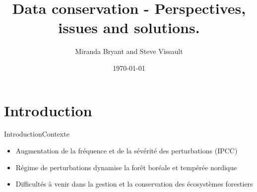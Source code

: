 \documentclass{eecslides}
\title[Data Storage]{Data conservation - Perspectives, issues and solutions.}
\author[M. Bryant and S. Vissault]{\color{white}  Miranda Bryant and Steve Vissault}
\institute[\color{white} UQAR]{\color{white} \textbf{Les midis numériques}}
\date{ \color{white} \today}
\begin{document}
\begin{frame}[plain]
\titlepage
\end{frame}


\section{Introduction}

\begin{frame}{Introduction}{Contexte}

\begin{itemize} 
	\item Augmentation de la fréquence et de la sévérité des perturbations (IPCC)
	\item Régime de perturbations dynamise la forêt boréale et tempérée nordique
	\item Difficultés à venir dans la gestion et la conservation des écosystèmes forestiers
\end{itemize}

\end{frame}





%	
%		
\end{document}
